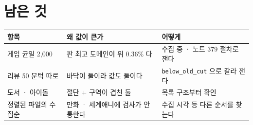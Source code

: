 \documentclass[11pt]{article}
\begin{document}
\section{남은 것}

\begin{center}
\begin{tabular}{lll}
\hline
항목 & 왜 값이 큰가 & 어떻게 \\
\hline
게임 균일 2,000 & 판 최고 도메인이 위 0.36\% 다 & 수집 중 · 노트 379 절차로 잰다 \\
리뷰 50 문턱 따로 & 바닥이 둘이라 값도 둘이다 & \texttt{below\_old\_cut} 으로 갈라 잰다 \\
도서 · 아이돌 & 절단 $+$ 구역이 겹친 둘 & 목록 구조부터 확인 \\
정렬된 파일의 수집순 & 만화 · 세계애니에 검사가 안 통한다 & 수집 시각 등 다른 순서를 찾는다 \\
\hline
\end{tabular}
\end{center}
\end{document}
